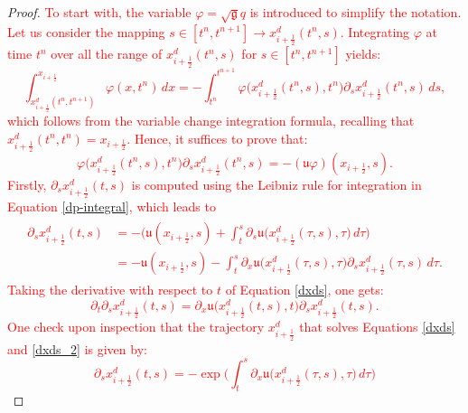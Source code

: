\documentclass[preprint,12pt]{elsarticle}
\begin{document}
\begin{linenumbers}
\begin{proof}
\textcolor{red}{
To start with, the variable $\varphi = \sqrt{\mathfrak{g}}q$ is introduced to simplify the notation.
Let us consider the mapping $s\in[t^n,t^{n+1}] \to  x_{i+\frac{1}{2}}^d(t^n,s)$. 
Integrating $\varphi$ at time $t^n$ over all the range of $x_{i+\frac{1}{2}}^d(t^n,s)$ for $s\in[t^n,t^{n+1}]$ yields:
\begin{equation}
	\label{depint_1}
	\int_{x_{i+\frac{1}{2}}^d(t^n,t^{n+1})}^{x_{i+\frac{1}{2}}}   
	\varphi(x,t^n)\,dx 
	= -\int_{t^n}^{t^{n+1}}  \varphi\big( x_{i+\frac{1}{2}}^d(t^n,s),t^n\big){\partial_s}{ x_{i+\frac{1}{2}}^d} (t^n,s)\,ds,
\end{equation}
which follows from the variable change integration formula, recalling that ${ x_{i+\frac{1}{2}}^d(t^n,t^{n}) = x_{i+\frac{1}{2}}}$. 
Hence, it suffices to prove that:
\begin{equation}
	\label{phi-u}
	\varphi\big( x_{i+\frac{1}{2}}^d(t^n,s),t^n\big){\partial_s}{ x_{i+\frac{1}{2}}^d} (t^n,s) = -(\mathfrak{u}\varphi)(x_{i+\frac{1}{2}},s).
\end{equation}
Firstly, ${\partial_s x_{i+\frac{1}{2}}^d}(t,s)$ is computed using the Leibniz rule for integration in Equation \eqref{dp-integral}, which leads to
\begin{align}
	\begin{split}
		\label{dxds}
		{\partial_s x_{i+\frac{1}{2}}^d} (t,s) &= - \bigg(\mathfrak{u}(x_{i+\frac{1}{2}},s) + 
		\int_{t}^{s} {\partial_s\mathfrak{u}}\big( x_{i+\frac{1}{2}}^d(\tau,s),\tau\big) \,d\tau \bigg)\\
		&=- \mathfrak{u}(x_{i+\frac{1}{2}},s) -
		\int_{t}^{s} {\partial_x}{\mathfrak{u}}\big( x_{i+\frac{1}{2}}^d(\tau, s),\tau\big) 
		{\partial_s  x_{i+\frac{1}{2}}^d}(\tau, s)\,d\tau.
	\end{split}
\end{align}
Taking the derivative with respect to $t$ of Equation \eqref{dxds}, one gets:
\begin{equation}
	\label{dxds_2}
	{\partial_t }{\partial_s  x_{i+\frac{1}{2}}^d}
	(t,s) = {\partial_x}{\mathfrak{u}}\big(x_{i+\frac{1}{2}}^d(t, s), t\big) 
	{\partial _s} x_{i+\frac{1}{2}}^d (t, s).
\end{equation}
One check upon inspection that the trajectory $x_{i+\frac{1}{2}}^d$ that solves Equations \eqref{dxds} and \eqref{dxds_2} is given by:
\begin{equation}
	\label{xs_int}
	{\partial_s  x_{i+\frac{1}{2}}^d}(t,s) = -
	\exp{\bigg(\int_{t}^{s} {\partial_x}{\mathfrak{u}}\big( x_{i+\frac{1}{2}}^d(\tau,s),\tau\big)  \,d\tau \bigg)}

\end{equation}}
\end{proof}
\end{linenumbers}
\end{document}
